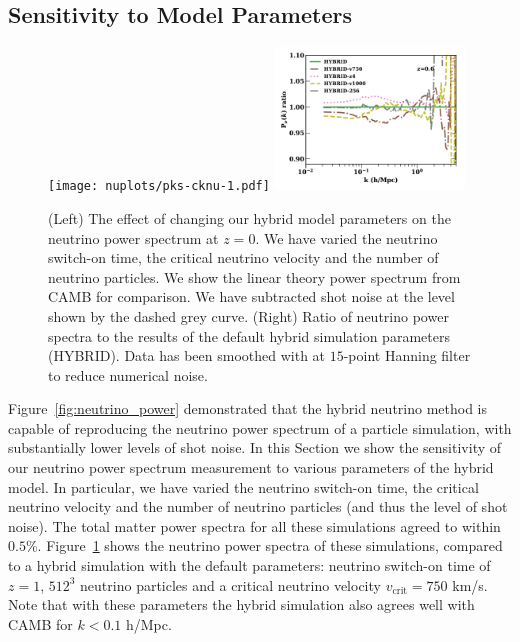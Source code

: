 \documentclass[useAMS, usenatbib]{mnras}
\begin{document}
\subsection{Sensitivity to Model Parameters}
\label{sec:check}

\begin{figure}
  \texttt{[image: nuplots/pks-cknu-1.pdf]}
  \includegraphics[width=0.45\textwidth]{nuplots/pks_nu_ckrel-1.pdf}
\caption{(Left) The effect of changing our hybrid model parameters on the neutrino power spectrum at $z=0$. We have varied the neutrino switch-on time, the critical neutrino velocity and the number of neutrino particles. We show the linear theory power spectrum from CAMB for comparison. We have subtracted shot noise at the level shown by the dashed grey curve. (Right) Ratio of neutrino power spectra to the results of the default hybrid simulation parameters (HYBRID). Data has been smoothed with at $15$-point Hanning filter to reduce numerical noise.}
  \label{fig:vcrit}
\end{figure}

Figure~\ref{fig:neutrino_power} demonstrated that the hybrid neutrino method is capable of reproducing the neutrino power spectrum of a particle simulation, with substantially lower levels of shot noise. In this Section we show the sensitivity of our neutrino power spectrum measurement to various parameters of the hybrid model. In particular, we have varied the neutrino switch-on time, the critical neutrino velocity and the number of neutrino particles (and thus the level of shot noise). The total matter power spectra for all these simulations agreed to within $0.5\%$. Figure~\ref{fig:vcrit} shows the neutrino power spectra of these simulations, compared to a hybrid simulation with the default parameters: neutrino switch-on time of $z=1$, $512^3$ neutrino particles and a critical neutrino velocity $v_\mathrm{crit} = 750$ km/s. Note that with these parameters the hybrid simulation also agrees well with CAMB for $k < 0.1$ h/Mpc. 
\end{document}
